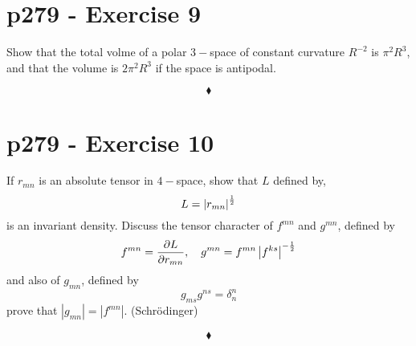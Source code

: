 \section{p279 - Exercise 9}
\begin{tcolorbox}
Show that the total volme of a polar $3-$space of constant curvature $R^{-2}$ is $\pi^2R^3$, and that the volume is $2\pi^2R^3$ if the space is antipodal.
\end{tcolorbox}

$$\blacklozenge$$
\newpage

\section{p279 - Exercise 10}
\begin{tcolorbox}
If $r_{mn}$ is an absolute tensor in $4-$space, show that $L$ defined by,
$$L=\left|r_{mn}\right|^{\frac{1}{2}}$$
is an invariant density. Discuss the tensor character of $f^{mn}$ and $g^{mn}$, defined by
$$f^{mn}=\pdv{L}{r_{mn}}, \quad g^{mn} = f^{mn}\left|f^{ks}\right|^{-\frac{1}{2}}$$
and also of $g_{mn}$, defined by
$$g_{ms}g^{ns}= \delta_n^n$$
prove that $\left|g_{mn}\right| = \left|f^{mn}\right|$. (Schrödinger)
\end{tcolorbox}

$$\blacklozenge$$
\newpage